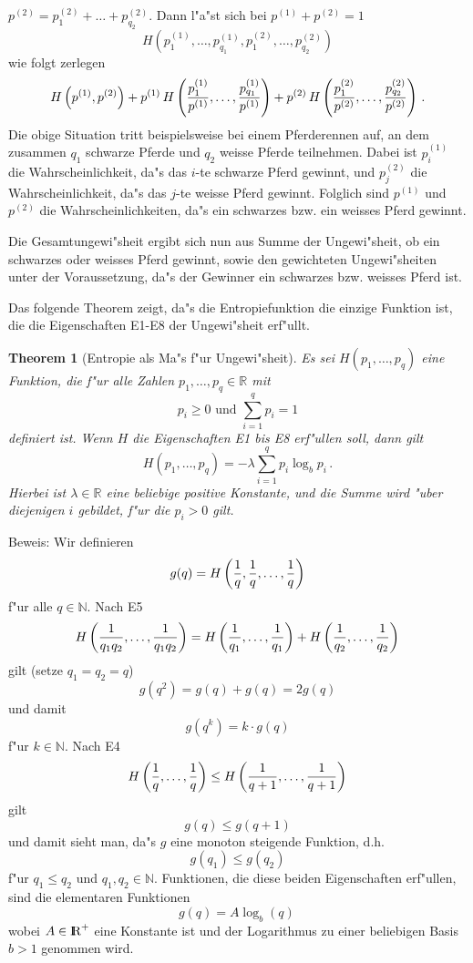 \documentclass[10pt]{article}
\newtheorem{theorem}{Theorem}[section]
\begin{document}
\begin{itemize}
    $p^{(2)}=p^{(2)}_1+\ldots +p^{(2)}_{q_2}$.
    Dann l"a"st sich bei $p^{(1)}+p^{(2)}=1$ 
    $$ H\left(p^{(1)}_1,\ldots,p^{(1)}_{q_1},
              p^{(2)}_1,\ldots,p^{(2)}_{q_2}\right) $$
    wie folgt zerlegen
    $$ H\left(p^{(1)},p^{(2)}\right) + 
       p^{(1)}\,
H\left({p^{(1)}_1\over p^{(1)}},\ldots ,{p^{(1)}_{q_1}\over p^{(1)}}\right) +
       p^{(2)}\,
H\left({p^{(2)}_1\over p^{(2)}},\ldots ,{p^{(2)}_{q_2}\over p^{(2)}}\right)\,.
    $$
    Die obige Situation tritt beispielsweise bei einem Pferderennen auf, an 
    dem zusammen $q_1$ schwarze Pferde und $q_2$ weisse Pferde teilnehmen.
    Dabei ist $p^{(1)}_i$ die Wahrscheinlichkeit, da"s das $i$-te 
    schwarze Pferd gewinnt, und $p^{(2)}_j$ die Wahrscheinlichkeit, da"s das 
    $j$-te weisse Pferd gewinnt. Folglich sind $p^{(1)}$ und
    $p^{(2)}$ die Wahrscheinlichkeiten, da"s ein schwarzes bzw. ein weisses 
    Pferd gewinnt.

    Die Gesamtungewi"sheit ergibt sich nun aus Summe der Ungewi"sheit, ob ein 
    schwarzes oder weisses Pferd gewinnt, sowie den gewichteten Ungewi"sheiten 
    unter der Voraussetzung, da"s der Gewinner ein schwarzes bzw. weisses Pferd 
    ist.
\end{itemize}
%
Das folgende Theorem zeigt, da"s die Entropiefunktion die einzige Funktion
ist, die die Eigenschaften E1-E8 der Ungewi"sheit erf"ullt.
%
\begin{theorem}[Entropie als Ma"s f"ur Ungewi"sheit]
  Es sei $H(p_1,\ldots,p_q)$ eine Funktion, die f"ur alle Zahlen
  $p_1,\ldots,p_q\in \mathbb{R}$ mit
  $$ p_i\ge 0 \mbox{ und } \sum_{i=1}^q p_i = 1 $$
  definiert ist. Wenn $H$ die Eigenschaften E1 bis E8 erf"ullen soll, dann gilt
  $$ H(p_1,\ldots,p_q)=-\lambda\sum_{i=1}^q p_i\log_b p_i \, .$$
  Hierbei ist $\lambda\in\mathbb{R}$ eine beliebige positive Konstante, und die
  Summe wird "uber diejenigen $i$ gebildet, f"ur die $p_i>0$ gilt.
\end{theorem}
Beweis: Wir definieren
$$ g(q)=H\left({1\over q},{1\over q},\ldots,{1\over q}\right) $$
f"ur alle $q\in\mathbb{N}$. 
Nach E5 
$$ H\left({1\over q_1 q_2},\ldots,{1\over q_1 q_2}\right) =
   H\left({1\over q_1},\ldots,{1\over q_1}\right) + 
   H\left({1\over q_2},\ldots,{1\over q_2}\right) $$
gilt (setze $q_1=q_2=q$)
$$ g(q^2)=g(q)+g(q)=2 g(q) $$
und damit
$$ g(q^k)=k\cdot g(q) $$
f"ur $k\in\mathbb{N}$. Nach E4
$$ H\left({1\over q},\ldots,{1\over q}\right) \le
   H\left({1\over q+1},\ldots,{1\over q+1}\right) $$
gilt 
$$ g(q)\le g(q+1) $$  
und damit sieht man, da"s $g$ eine monoton steigende Funktion, d.h.
$$ g(q_1)\le g(q_2)$$
f"ur $q_1\le q_2$ und $q_1,q_2\in\mathbb{N}$. Funktionen, die 
diese beiden Eigenschaften erf"ullen, sind die elementaren Funktionen
$$ g(q)=A\log_b(q) \, $$
wobei $A\in\R^+$ eine Konstante ist und der Logarithmus zu einer beliebigen
Basis $b>1$ genommen wird.
\end{document}
